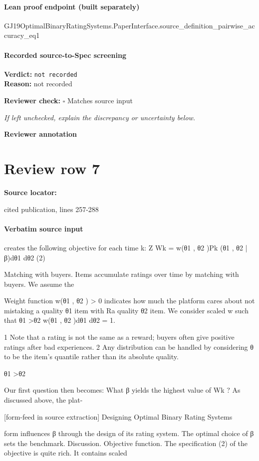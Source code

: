 \documentclass[10pt]{article}
\newcommand{\reviewerbox}{%
  \par\noindent\fbox{\parbox{0.96\linewidth}{\rule{0pt}{0.38in}}}\par
}
\newcommand{\reviewmatch}[1]{%
  \par\noindent\textbf{Reviewer check:} $\square$\; #1\par
  \noindent\emph{If left unchecked, explain the discrepancy or uncertainty below.}\par
}
\begin{document}
\paragraph{Lean proof endpoint (built separately)}\begin{ReviewVerbatim}
GJ19OptimalBinaryRatingSystems.PaperInterface.source_definition_pairwise_accuracy_eq1
\end{ReviewVerbatim}

\paragraph{Recorded source-to-Spec screening}
\textbf{Verdict:} \texttt{not recorded}
\\
\textbf{Reason:} not recorded
\reviewmatch{Matches source input}
\noindent\textbf{Reviewer annotation}\par
\reviewerbox
\clearpage
\hypertarget{source-claim-88670d8e30834161}{}
\section*{Review row 7}
\textbf{Source locator:} {\footnotesize\raggedright cited publication, lines 257-\allowbreak{}288\par}
\paragraph{Verbatim source input}
\begin{ReviewVerbatim}
creates the following objective for each time k:
Z
Wk =
w(θ1 , θ2 )Pk (θ1 , θ2 |β)dθ1 dθ2
(2)

Matching with buyers. Items accumulate ratings
over time by matching with buyers. We assume the

Weight function w(θ1 , θ2 ) > 0 indicates how much
the platform cares about not mistaking a quality θ1
item with Ra quality θ2 item. We consider scaled w
such that θ1 >θ2 w(θ1 , θ2 )dθ1 dθ2 = 1.

1
Note that a rating is not the same as a reward; buyers
often give positive ratings after bad experiences.
2
Any distribution can be handled by considering θ to
be the item’s quantile rather than its absolute quality.

θ1 >θ2

Our first question then becomes: What β yields the
highest value of Wk ? As discussed above, the plat-


[form-feed in source extraction]
Designing Optimal Binary Rating Systems

form influences β through the design of its rating
system. The optimal choice of β sets the benchmark.
Discussion. Objective function. The specification
(2) of the objective is quite rich. It contains scaled
\end{ReviewVerbatim}
\end{document}
